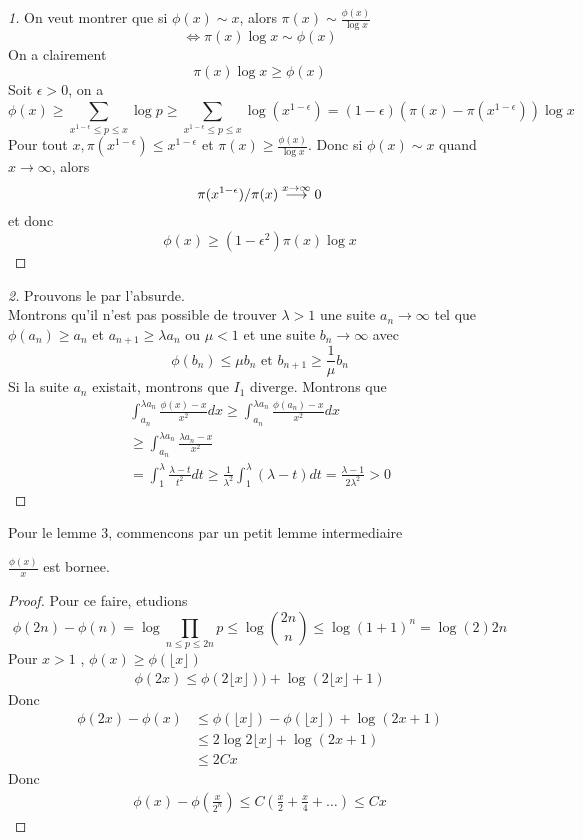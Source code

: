 \documentclass[../main.tex]{subfiles}
\begin{document}
\begin{proof}[1]
On veut montrer que si $\phi( x) \sim x$, alors $\pi( x) \sim \frac{\phi( x) }{\log x}$
\[ 
\iff \pi( x) \log x \sim \phi( x) 
\]
On a clairement
\[ 
\pi( x) \log x \geq \phi( x) 
\]
Soit $\epsilon>0$, on a
\[ 
\phi( x) \geq  \sum_{x^{1-\epsilon} \leq p \leq x  }^{ }\log p \geq \sum_{x^{1-\epsilon} \leq p \leq  x}^{ } \log ( x^{1-\epsilon}) = ( 1-\epsilon) ( \pi( x) -\pi( x^{1-\epsilon}) ) \log x
\]
Pour tout $x, \pi( x^{1-\epsilon}) \leq x^{1-\epsilon}$ et $\pi( x) \geq \frac{\phi( x) }{\log x}$. Donc si $\phi( x) \sim x$ quand $x\to \infty $, alors
\[ 
\pi( x^{1-\epsilon}) / \pi( x) \overset{ x\to \infty }{\longrightarrow} 0
\]
et donc
\[ 
\phi( x) \geq ( 1-\epsilon^{2}) \pi( x) \log x
\]
	

\end{proof}
\begin{proof}[2]
Prouvons le par l'absurde.\\
Montrons qu'il n'est pas possible de trouver $\lambda>1$  une suite $a_n\to \infty $ tel que $\phi( a_n) \geq a_n $ et $a_{n+1} \geq \lambda a_n$  ou $\mu<1$ et une suite $b_n\to \infty $ avec 
\[ 
\phi( b_n) \leq \mu b_n \text{ et } b_{n+1} \geq \frac{1}{\mu}b_n	
\]
Si la suite $a_n$ existait, montrons que $I_1$ diverge.	
Montrons que
\begin{align*}
\int_{ a_n }^{ \lambda a_n }	\frac{\phi( x) -x}{x^{2}}dx \geq \int_{ a_n }^{ \lambda a_n } \frac{\phi( a_n) -x}{x^{2}}dx\\
\geq \int_{ a_n }^{ \lambda a_n } \frac{\lambda a_n -x}{x^{2}}\\
= \int_{ 1 }^{ \lambda} \frac{\lambda-t}{t^{2}} dt \geq \frac{1}{\lambda^{2}}\int_{ 1 }^{ \lambda } ( \lambda-t) dt = \frac{\lambda-1}{2\lambda^{2}}>0
\end{align*}

\end{proof}
Pour le lemme 3, commencons par un petit lemme intermediaire
\begin{lemma}
$\frac{\phi( x) }{x}$ est bornee.
\end{lemma}
\begin{proof}
Pour ce faire, etudions 
\[ 
\phi( 2n) -\phi( n) = \log \prod_{n \leq p \leq 2n} p \leq \log \binom { 2n } n \leq \log ( 1+1)^{n}= \log ( 2 ) 2n
\]
Pour $x>1$ , $\phi( x) \geq \phi( \lfloor x \rfloor) $ 
\begin{align*}
\phi( 2x) \leq \phi( 2 \lfloor x \rfloor) )+ \log ( 2 \lfloor x \rfloor +1) 
\end{align*}
Donc
\begin{align*}
	\phi( 2x) -\phi( x) &\leq \phi( \lfloor x \rfloor ) - \phi( \lfloor x \rfloor ) + \log ( 2x+1) \\
			    & \leq 2 \log 2 \lfloor x \rfloor + \log ( 2x+1 )\\
			    & \leq 2 Cx
\end{align*}
Donc
\begin{align*}
\phi( x) - \phi(  \frac{x}{2^{n}}) \leq C( \frac{x}{2}+ \frac{x}{4}+ \ldots) \leq Cx
\end{align*}



\end{proof}
\end{document}
